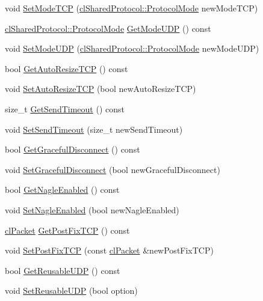 \begin{DoxyCompactItemize}
\item 
void \hyperlink{classcl_instance_profile_acd25bd3d9df9b90ace8e8b831d68bbb6}{SetModeTCP} (\hyperlink{classcl_shared_protocol_a4b0b9c82b8ae4eee78c6308c35afd47b}{clSharedProtocol::ProtocolMode} newModeTCP)
\item 
\hyperlink{classcl_shared_protocol_a4b0b9c82b8ae4eee78c6308c35afd47b}{clSharedProtocol::ProtocolMode} \hyperlink{classcl_instance_profile_a85dd82fa5342cab74133fe11762e0189}{GetModeUDP} () const 
\item 
void \hyperlink{classcl_instance_profile_a1184d133c589b502cb3de1254cb7fc8d}{SetModeUDP} (\hyperlink{classcl_shared_protocol_a4b0b9c82b8ae4eee78c6308c35afd47b}{clSharedProtocol::ProtocolMode} newModeUDP)
\item 
bool \hyperlink{classcl_instance_profile_a58908936be05fb3930d6f9a0932eb4e2}{GetAutoResizeTCP} () const 
\item 
void \hyperlink{classcl_instance_profile_a6c29661fd78f64b040b8be2d6ce150c3}{SetAutoResizeTCP} (bool newAutoResizeTCP)
\item 
size\_\-t \hyperlink{classcl_instance_profile_a2e71548556fffbb4c89a83e1d4a2f389}{GetSendTimeout} () const 
\item 
void \hyperlink{classcl_instance_profile_a19f70381305386f41fb08057bfb6375f}{SetSendTimeout} (size\_\-t newSendTimeout)
\item 
bool \hyperlink{classcl_instance_profile_ace596874c27bd0d4b102513063e81534}{GetGracefulDisconnect} () const 
\item 
void \hyperlink{classcl_instance_profile_aba9027e93cb443766b0c2a213d92384c}{SetGracefulDisconnect} (bool newGracefulDisconnect)
\item 
bool \hyperlink{classcl_instance_profile_a77ac8f0cd873d6dae3dc4a19a167acc0}{GetNagleEnabled} () const 
\item 
void \hyperlink{classcl_instance_profile_a015ef923a3490d87c1dbb1ae70776e61}{SetNagleEnabled} (bool newNagleEnabled)
\item 
\hyperlink{classcl_packet}{clPacket} \hyperlink{classcl_instance_profile_a9c1e12ff2d9d011b7a8a0b52cb8b4723}{GetPostFixTCP} () const 
\item 
void \hyperlink{classcl_instance_profile_a588ac2cc6a96ab808e1d91c150882de5}{SetPostFixTCP} (const \hyperlink{classcl_packet}{clPacket} \&newPostFixTCP)
\item 
bool \hyperlink{classcl_instance_profile_aa9a06bc209989cd8cf8dbc3cde527dea}{GetReusableUDP} () const 
\item 
void \hyperlink{classcl_instance_profile_a9094e22a8369d8eb60235a61e7607c5e}{SetReusableUDP} (bool option)

\end{DoxyCompactItemize}
